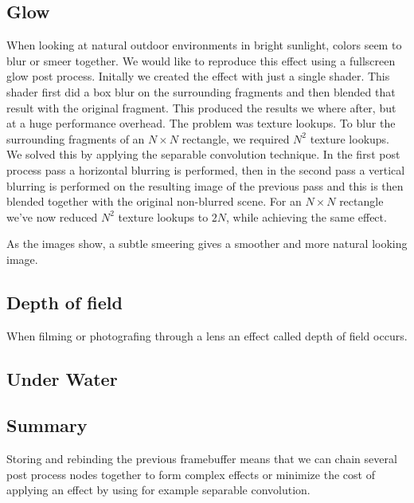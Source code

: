 

\subsection{Glow}

When looking at natural outdoor environments in bright sunlight,
colors seem to blur or smeer together. We would like to reproduce this
effect using a fullscreen glow post process. Initally we created the
effect with just a single shader. This shader first did a box blur on
the surrounding fragments and then blended that result with the
original fragment. This produced the results we where after, but at a
huge performance overhead. The problem was texture lookups. To blur
the surrounding fragments of an $N \times N$ rectangle, we required
$N^2$ texture lookups. We solved this by applying the separable
convolution technique. In the first post process pass a horizontal
blurring is performed, then in the second pass a vertical blurring is
performed on the resulting image of the previous pass and this is then
blended together with the original non-blurred scene. For an $N \times
N$ rectangle we've now reduced $N^2$ texture lookups to $2N$, while
achieving the same effect.


As the images show, a subtle smeering gives a smoother and more
natural looking image.


\subsection{Depth of field}

When filming or photografing through a lens an effect called depth of
field occurs.


\subsection{Under Water}




\subsection{Summary}

Storing and rebinding the previous framebuffer means that we can chain
several post process nodes together to form complex effects or
minimize the cost of applying an effect by using for example separable
convolution.





